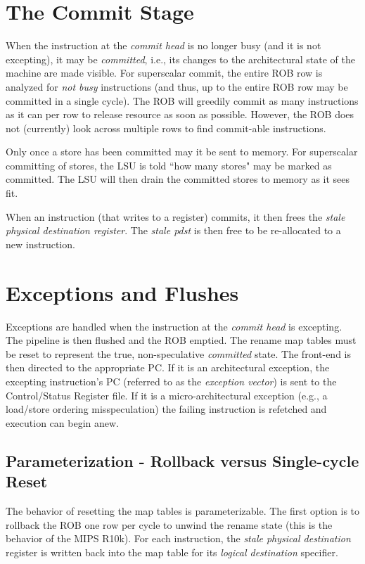 \section{The Commit Stage}

When the instruction at the {\em commit head} is no longer busy (and it is not excepting), it may be {\em committed}, i.e., its changes to the architectural state of the machine are made visible. For superscalar commit, the entire ROB row is analyzed for {\em not busy} instructions (and thus, up to the entire ROB row may be committed in a single cycle). The ROB will greedily commit as many instructions as it can per row to release resource as soon as possible. However, the ROB does not (currently) look across multiple rows to find commit-able instructions. 

Only once a store has been committed may it be sent to memory. For superscalar committing of stores, the LSU is told ``how many stores" may be marked as committed. The LSU will then drain the committed stores to memory as it sees fit. 

When an instruction (that writes to a register) commits, it then frees the {\em stale physical destination register}. The {\em stale pdst} is then free to be re-allocated to a new instruction. 


\section{Exceptions and Flushes}

Exceptions are handled when the instruction at the {\em commit head} is excepting. The pipeline is then flushed and the ROB emptied. The rename map tables must be reset to represent the true, non-speculative {\em committed} state. The front-end is then directed to the appropriate PC.  If it is an architectural exception, the excepting instruction's PC (referred to as the {\em exception vector}) is sent to the Control/Status Register file.  If it is a micro-architectural exception (e.g., a load/store ordering misspeculation) the failing instruction is refetched and execution can begin anew. 

\subsection{Parameterization - Rollback versus Single-cycle Reset}

The behavior of resetting the map tables is parameterizable.  The first option is to rollback the ROB one row per cycle to unwind the rename state (this is the behavior of the MIPS R10k\cite{mipsr10k}).  For each instruction, the {\em stale physical destination} register is written back into the map table for its {\em logical destination} specifier. 


